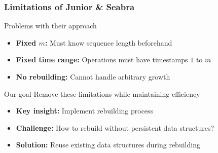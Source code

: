\documentclass[fleqn]{beamer}
\begin{document}
\begin{frame}
    \frametitle{Limitations of Junior \& Seabra}
    
    \begin{alertblock}{Problems with their approach}
        \begin{itemize}
        \item \textbf{Fixed $m$:} Must know sequence length beforehand
        \item \textbf{Fixed time range:} Operations must have timestamps $1$ to $m$
        \item \textbf{No rebuilding:} Cannot handle arbitrary growth
        \end{itemize}
    \end{alertblock} \pause
    
    \begin{block}{Our goal}
        Remove these limitations while maintaining efficiency
    \end{block} \pause
    
    \begin{itemize}
    \item \textbf{Key insight:} Implement rebuilding process \vfill
    \item \textbf{Challenge:} How to rebuild without persistent data structures? \vfill
    \item \textbf{Solution:} Reuse existing data structures during rebuilding \vfill
    \end{itemize}
\end{frame}
\end{document}
